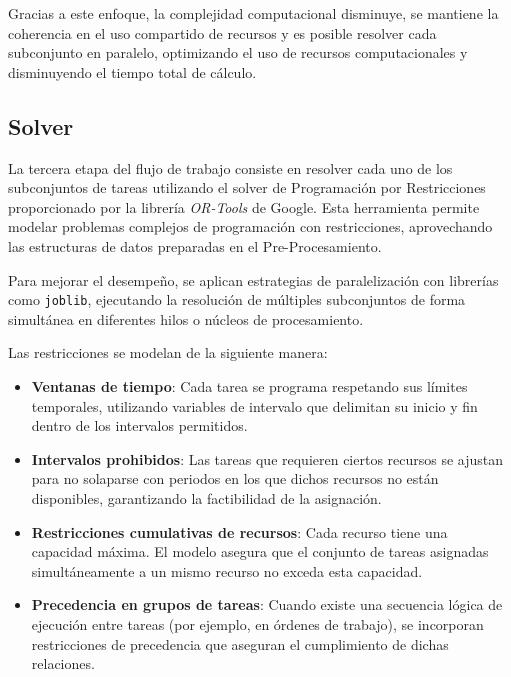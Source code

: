 \documentclass{article}
\begin{document}
Gracias a este enfoque, la complejidad computacional disminuye, se mantiene la coherencia en el uso compartido de recursos y es posible resolver cada subconjunto en paralelo, optimizando el uso de recursos computacionales y disminuyendo el tiempo total de cálculo.


\subsection{Solver}

La tercera etapa del flujo de trabajo consiste en resolver cada uno de los subconjuntos de tareas utilizando el solver de Programación por Restricciones proporcionado por la librería \textit{OR-Tools} de Google. Esta herramienta permite modelar problemas complejos de programación con restricciones, aprovechando las estructuras de datos preparadas en el Pre-Procesamiento.

Para mejorar el desempeño, se aplican estrategias de paralelización con librerías como \texttt{joblib}, ejecutando la resolución de múltiples subconjuntos de forma simultánea en diferentes hilos o núcleos de procesamiento.

Las restricciones se modelan de la siguiente manera:

\begin{itemize}
    \item \textbf{Ventanas de tiempo}: Cada tarea se programa respetando sus límites temporales, utilizando variables de intervalo que delimitan su inicio y fin dentro de los intervalos permitidos.
    
    \item \textbf{Intervalos prohibidos}: Las tareas que requieren ciertos recursos se ajustan para no solaparse con periodos en los que dichos recursos no están disponibles, garantizando la factibilidad de la asignación.

    \item \textbf{Restricciones cumulativas de recursos}: Cada recurso tiene una capacidad máxima. El modelo asegura que el conjunto de tareas asignadas simultáneamente a un mismo recurso no exceda esta capacidad.

    \item \textbf{Precedencia en grupos de tareas}: Cuando existe una secuencia lógica de ejecución entre tareas (por ejemplo, en órdenes de trabajo), se incorporan restricciones de precedencia que aseguran el cumplimiento de dichas relaciones.

\end{itemize}
\end{document}

